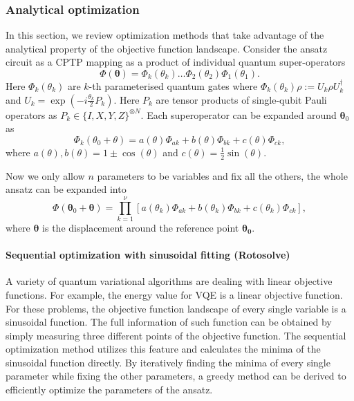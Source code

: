\subsubsection{Analytical optimization} \label{sec:analytical_opt}

In this section, we review optimization methods that take advantage of the analytical property of the objective function landscape. Consider the ansatz circuit as a CPTP mapping as a product of individual quantum super-operators
\begin{equation}\label{fullansatz}
\Phi(\boldsymbol{\theta}) = \Phi_k(\theta_k) \dots \Phi_2(\theta_2) \Phi_1(\theta_1).
\end{equation}	
Here $\Phi_k(\theta_k)$ are $k$-th parameterised quantum gates where $\Phi_k(\theta_k) \rho := U_k \rho U_{k}^{\dagger} $
and $U_k=\exp(- i \frac{\theta_k}{2} P_k)$. Here $P_k$ are tensor products of single-qubit
Pauli operators as $P_k \in \{I, X, Y ,Z\}^{\otimes N}$. Each superoperator can be expanded around $\boldsymbol{\theta}_0$ as
\begin{equation}
\Phi_k(\theta_0 + \theta) = 
a(\theta) \Phi_{ak}
+ b(\theta) \Phi_{bk}
+ c(\theta) \Phi_{ck},
\end{equation}
where $a(\theta), b(\theta) = 1\pm\cos(\theta)$ and $c(\theta) = \frac{1}{2}\sin(\theta)$.

Now we only allow $n$ parameters to be variables and fix all the others, the whole ansatz can be expanded into 
\begin{equation}\label{eq:optimization:ansatz_expansion}
\Phi(\boldsymbol{\theta}_0 {+} \boldsymbol{\theta})
= 
\prod_{k=1}^\nu
[a(\theta_k) \Phi_{ak}
+ b(\theta_k) \Phi_{bk}
+ c(\theta_k) \Phi_{ck}],
\end{equation}	
where $\boldsymbol{\theta}$ is the displacement around the reference point $\mathbf{\theta_0}$.

\paragraph{Sequential optimization with sinusoidal fitting (Rotosolve)}

A variety of quantum variational algorithms are dealing with linear objective functions. For example, the energy value for VQE is a linear objective function. For these problems, the objective function landscape of every single variable is a sinusoidal function. The full information of such function can be obtained by simply measuring three different points of the objective function. The sequential optimization method \cite{Vidal2018, nakanishi_sequential_2020,ostaszewskiStructureOptimizationParameterized2021} utilizes this feature and calculates the minima of the sinusoidal function directly. By iteratively finding the minima of every single parameter while fixing the other parameters, a greedy method can be derived to efficiently optimize the parameters of the ansatz.


